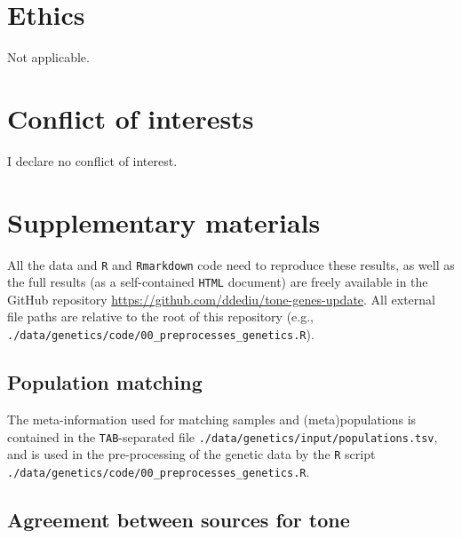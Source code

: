 \documentclass[twoside,twocolumn]{article}
\begin{document}
\section*{Ethics}

Not applicable.



\section*{Conflict of interests}

I declare no conflict of interest.







\onecolumn
\section{Supplementary materials}

All the data and \texttt{R} and \texttt{Rmarkdown} code need to reproduce these results, as well as the full results (as a self-contained \texttt{HTML} document) are freely available in the GitHub repository \url{https://github.com/ddediu/tone-genes-update}.
All external file paths are relative to the root of this repository (e.g., \verb|./data/genetics/code/00_preprocesses_genetics.R|).


\subsection{Population matching} \label{SM:pop_match}

The meta-information used for matching samples and (meta)populations is contained in the \texttt{TAB}-separated file \verb|./data/genetics/input/populations.tsv|, and is used in the pre-processing of the genetic data by the \texttt{R} script \verb|./data/genetics/code/00_preprocesses_genetics.R|.


\subsection{Agreement between sources for tone} \label{SM:tone_agreeemnt_sources}
\end{document}
